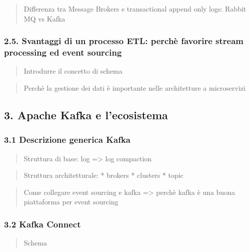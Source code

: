 \documentclass[]{article}
\begin{document}
\begin{quote}
Differenza tra Message Brokers e transactional append only logs: Rabbit
MQ vs Kafka
\end{quote}

\subsubsection{2.5. Svantaggi di un processo ETL: perchè favorire stream
processing ed event
sourcing}\label{svantaggi-di-un-processo-etl-perchuxe8-favorire-stream-processing-ed-event-sourcing}

\begin{quote}
Introdurre il concetto di schema
\end{quote}

\begin{quote}
Perchè la gestione dei dati è importante nelle architetture a
microservizi
\end{quote}

\subsection{3. Apache Kafka e
l'ecosistema}\label{apache-kafka-e-lecosistema}

\subsubsection{3.1 Descrizione generica
Kafka}\label{descrizione-generica-kafka}

\begin{quote}
Struttura di base: log =\textgreater{} log compaction
\end{quote}

\begin{quote}
Struttura architetturale: * brokers * clusters * topic
\end{quote}

\begin{quote}
Come collegare event sourcing e kafka =\textgreater{} perchè kafka è una
buona piattaforma per event sourcing
\end{quote}

\subsubsection{3.2 Kafka Connect}\label{kafka-connect}

\begin{quote}
Schema
\end{quote}
\end{document}
